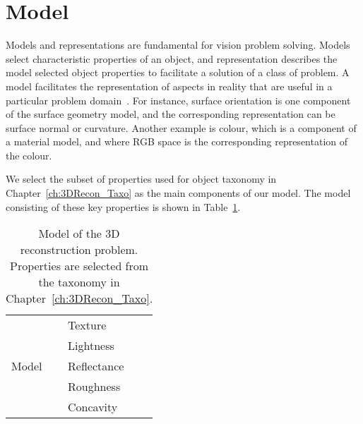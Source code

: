 \section{Model}
\label{sec:3DRecon_Model}
Models and representations are fundamental for vision problem solving. Models select characteristic properties of an object, and representation describes the model selected object properties to facilitate a solution of a class of problem. A model facilitates the representation of aspects in reality that are useful in a particular problem domain~\cite{bolles19863dpo}. For instance, surface orientation is one component of the surface geometry model, and the corresponding representation can be surface normal or curvature. Another example is colour, which is a component of a material model, and where RGB space is the corresponding representation of the colour.

We select the subset of properties used for object taxonomy in Chapter~\ref{ch:3DRecon_Taxo} as the main components of our model. The model consisting of these key properties is shown in Table~\ref{tab:3DRecon_model}.
\begin{table}[!htbp]
  \centering
  \begin{tabular}{l|l}
  \toprule
  \multirow{5}{*}{Model} & Texture\\
  & Lightness\\
  & Reflectance\\
  & Roughness\\
  & Concavity\\
  \bottomrule
  \end{tabular}
  \caption{Model of the 3D reconstruction problem. Properties are selected from the taxonomy in Chapter~\ref{ch:3DRecon_Taxo}.}
  \label{tab:3DRecon_model}
\end{table}



